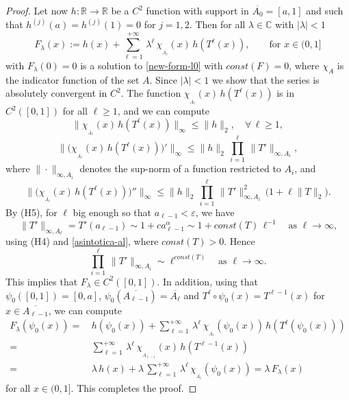 \documentclass[10pt,a4paper]{amsart}
\newcommand{\C}{\mathbb C}
\newcommand{\R}{\mathbb R}
\newcommand{\eps}{\varepsilon}
\begin{document}
\begin{proof}
Let now $h:\R \to \R$ be a $C^2$ function with support in $\overline{A_0} =[a,1]$ and such that $h^{(j)}(a) = h^{(j)}(1) =0$ for $j=1,2$. Then for all $\lambda \in \C$ with $|\lambda|<1$
\begin{equation}\label{f-lambda}
F_\lambda(x) := h(x) + \sum_{\ell=1}^{+\infty}\, \lambda^\ell\, \chi_{_{\overline{A_\ell}}}(x)\, h(T^\ell(x)),\qquad \text{for $x\in (0,1]$}
\end{equation}
with $F_\lambda(0)=0$ is a solution to \eqref{new-form-l0} with $const(F)=0$, where $\chi_{A}$ is the indicator function of the set $A$. Since $|\lambda|<1$ we show that the series is absolutely convergent in $C^2$. The function $\chi_{_{\overline{A_\ell}}}(x)\, h(T^\ell(x))$ is in $C^2([0,1])$ for all $\ell\ge 1$, and we can compute
\[
\| \chi_{_{\overline{A_\ell}}}(x)\, h(T^\ell(x)) \|_\infty \le \|h\|_2, \quad \forall\, \ell\ge 1,
\]  
\[
\| \Big( \chi_{_{\overline{A_\ell}}}(x)\, h(T^\ell(x)) \Big)' \|_\infty \le \| h\|_2\, \prod_{i=1}^{\ell}\, \| T' \|_{\infty,A_i},
\]
where $\|\cdot\|_{\infty,A_i}$ denotes the sup-norm of a function restricted to $A_i$, and
\[
\| \Big( \chi_{_{\overline{A_\ell}}}(x)\, h(T^\ell(x)) \Big)'' \|_\infty \le \| h\|_2\, \prod_{i=1}^{\ell}\, \| T' \|_{\infty,A_i}^2\, \Big(1+ \ell \|T\|_2\Big).
\]
By (H5), for $\ell$ big enough so that $a_{\ell-1}<\eps$, we have 
\[
\| T' \|_{\infty,A_\ell} = T'(a_{\ell-1}) \sim 1 + c a_{\ell-1}^\alpha \sim 1 + const(T) \, \ell^{-1} \quad \text{as $\ell \to \infty$,}
\]
using (H4) and \eqref{asintotica-al}, where $const(T)>0$. Hence
\[
\prod_{i=1}^{\ell}\, \| T' \|_{\infty,A_i} \sim \ell^{const(T)} \quad \text{as $\ell \to \infty$.}
\]
This implies that $F_\lambda \in C^2([0,1])$. In addition, using that $\psi_0([0,1]) = [0,a]$, $\psi_0(\overline{A_{\ell-1}}) = \overline{A_\ell}$ and $T^\ell \circ \psi_0(x) = T^{\ell-1}(x)$ for $x\in\overline{A_{\ell-1}}$, we can compute 
\[
\begin{aligned}
F_\lambda(\psi_0(x)) =\, & h(\psi_0(x)) + \sum_{\ell=1}^{+\infty}\, \lambda^\ell\, \chi_{_{\overline{A_\ell}}}(\psi_0(x))\, h(T^\ell(\psi_0(x))) \\
=\, & \sum_{\ell=1}^{+\infty}\, \lambda^\ell\, \chi_{_{\overline{A_{\ell-1}}}}(x)\, h(T^{\ell-1}(x)) \\
=\, & \lambda\, h(x) + \lambda\, \sum_{\ell=1}^{+\infty}\, \lambda^\ell\, \chi_{_{\overline{A_\ell}}}(\psi_0(x)) = \lambda\, F_\lambda(x)
\end{aligned}
\]
for all $x\in (0,1]$. This completes the proof.
\end{proof}
\end{document}
